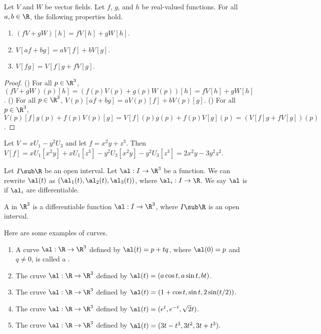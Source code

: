 \documentclass[10pt]{article}
\begin{document}
\begin{proposition}
    Let $V$ and $W$ be vector fields. Let $f$, $g$, and $h$ be real-valued functions. For all $a,b\in\R$, the following properties hold.
    \begin{enumerate}
        \item $(fV+gW)[h]=fV[h]+gW[h]$.
        \item $V[af+bg]=aV[f]+bV[g]$.
        \item $V[fg]=V[f]g+fV[g]$.
    \end{enumerate}
\end{proposition}
\begin{proof}
    () For all $p\in{\R}^{3}$, $(fV+gW)(p)[h]=(f(p)V(p)+g(p)W(p))[h]=fV[h]+gW[h]$. () For all $p\in{\R}^{3}$, $V(p)[af+bg]=aV(p)[f]+bV(p)[g]$. () For all $p\in{\R}^{3}$, $V(p)[f]g(p)+f(p)V(p)[g]=V[f](p)g(p)+f(p)V[g](p)=(V[f]g+fV[g])(p)$.
\end{proof}
\begin{example}
    Let $V=x{U}_{1}-{y}^{2}{U}_{3}$ and let $f={x}^{2}y+{z}^{3}$. Then $V[f]=x{U}_{1}[{x}^{2}y]+x{U}_{1}[{z}^{3}]-{y}^{2}{U}_{3}[{x}^{2}y]-{y}^{2}{U}_{3}[{z}^{3}]=2{x}^{2}y-3{y}^{2}{z}^{2}$.
\end{example}
\par
Let $I\sub\R$ be an open interval. Let $\al:I\to{\R}^{3}$ be a function. We can rewrite $\al(t)$ as $({\al}_{1}(t),{\al}_{2}(t),{\al}_{3}(t))$, where ${\al}_{i}:I\to\R$. We say $\al$ is  if ${\al}_{i}$ are differentiable.
\begin{definition}
    A  in ${\R}^{3}$ is a differentiable function $\al:I\to{\R}^{3}$, where $I\sub\R$ is an open interval.
\end{definition}
\begin{example}
    Here are some examples of curves.
    \begin{enumerate}
        \item A curve $\al:\R\to{\R}^{3}$ defined by $\al(t)=p+tq$, where $\al(0)=p$ and $q\ne 0$, is called a .
        \item The cruve $\al:\R\to{\R}^{3}$ defined by $\al(t)=(a\cos t,a\sin t,bt)$.
        \item The cruve $\al:\R\to{\R}^{3}$ defined by $\al(t)=(1+\cos t,\sin t,2\sin(t/2))$.
        \item The cruve $\al:\R\to{\R}^{3}$ defined by $\al(t)=({e}^{t},{e}^{-t},\sqrt{2}t)$.
        \item The cruve $\al:\R\to{\R}^{3}$ defined by $\al(t)=(3t-{t}^{3},3{t}^{2},3t+{t}^{3})$.
    \end{enumerate}
\end{example}
\end{document}
